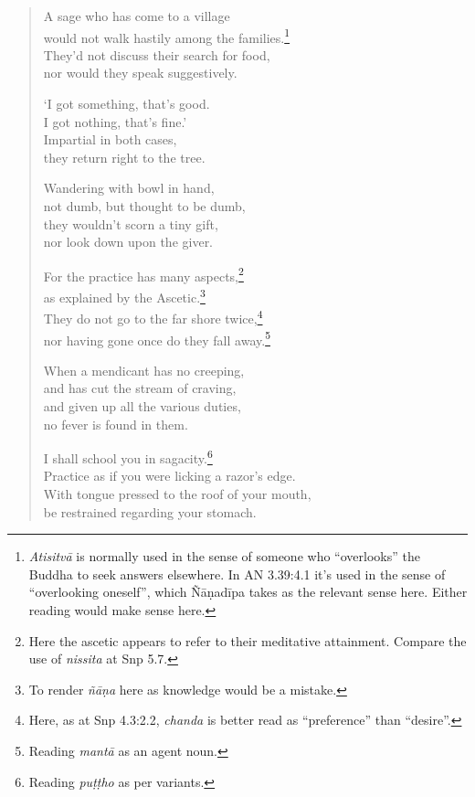 \documentclass[12pt,openany]{book}%
\begin{document}
\begin{verse}
A sage who has come to a village \\
would not walk hastily among the families.\footnote{\textit{\textsanskrit{Atisitvā}} is normally used in the sense of someone who “overlooks” the Buddha to seek answers elsewhere. In AN 3.39:4.1 it’s used in the sense of “overlooking oneself”, which \textsanskrit{Ñāṇadīpa} takes as the relevant sense here. Either reading would make sense here. } \\
They’d not discuss their search for food, \\
nor would they speak suggestively. 

‘I got something, that’s good. \\
I got nothing, that’s fine.’ \\
Impartial in both cases, \\
they return right to the tree. 

Wandering with bowl in hand, \\
not dumb, but thought to be dumb, \\
they wouldn’t scorn a tiny gift, \\
nor look down upon the giver. 

For the practice has many aspects,\footnote{Here the ascetic appears to refer to their meditative attainment. Compare the use of \textit{nissita} at Snp 5.7. } \\
as explained by the Ascetic.\footnote{To render \textit{\textsanskrit{ñāṇa}} here as knowledge would be a mistake. } \\
They do not go to the far shore twice,\footnote{Here, as at Snp 4.3:2.2, \textit{chanda} is better read as “preference” than “desire”. } \\
nor having gone once do they fall away.\footnote{Reading \textit{\textsanskrit{mantā}}  as an agent noun. } 

When a mendicant has no creeping, \\
and has cut the stream of craving, \\
and given up all the various duties, \\
no fever is found in them. 

I shall school you in sagacity.\footnote{Reading \textit{\textsanskrit{puṭṭho}} as per variants. } \\
Practice as if you were licking a razor’s edge. \\
With tongue pressed to the roof of your mouth, \\
be restrained regarding your stomach. 


\end{verse}
\end{document}
